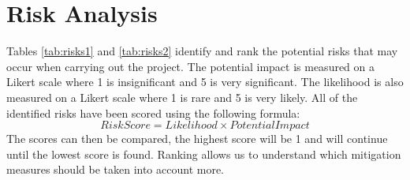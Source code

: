 \documentclass[12pt]{article}
\theoremstyle{plain}
\theoremstyle{definition}
\begin{document}
\section{Risk Analysis}
\label{sec:risk}

Tables \ref{tab:risks1} and \ref{tab:risks2} identify and rank the potential risks that may occur when carrying out the project. The potential impact is measured on a Likert scale where 1 is insignificant and 5 is very significant. The likelihood is also measured on a Likert scale where 1 is rare and 5 is very likely. All of the identified risks have been scored using the following formula:
\[
  Risk Score = Likelihood \times Potential Impact
\]
The scores can then be compared, the highest score will be 1 and will continue until the lowest score is found. Ranking allows us to understand which mitigation measures should be taken into account more.
\end{document}
